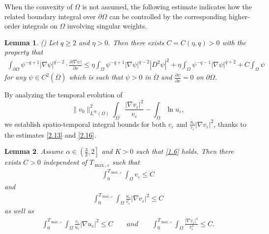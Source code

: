 \documentclass[12pt]{article}
\theoremstyle{plain}
\newtheorem{lemma}{Lemma}[section]
\theoremstyle{definition}
\numberwithin{equation}{section}
\begin{document}
When the  convexity of $\Omega$ is not assumed, the following estimate indicates  how the related boundary integral over $\partial \Omega$ can be controlled by the corresponding higher-order integrals on $\Omega$ involving singular weights.
\begin{lemma}\label{lemma2.4}(\cite{WDCDSB})
    Let $q\geq2$ and $\eta>0$. Then there exists $C=C(\eta,q)>0$ with the property that
    \begin{align}\label{2.16}
        \int_{\partial\Omega}\psi^{-q+1}|\nabla\psi|^{q-2}\cdot\frac{\partial|\nabla \psi|}{\partial\nu}\leq \eta
        \int_{\Omega}\psi^{-q+1}|\nabla\psi|^{q-2}|D^2\psi|^2+\eta\int_{\Omega}\psi^{-q-1}|\nabla\psi|^{q+2}+C\int_{\Omega}\psi
    \end{align}
    for any $\psi\in C^2(\overline{\Omega})$ which is such that $\psi>0$ in $\overline{\Omega}$ and $\frac{\partial\psi}{\partial\nu}=0$ on
    $\partial\Omega$.
\end{lemma}
By analyzing the temporal evolution of
 $$\|v_0\|_{L^{\infty}(\Omega)}^2\int_{\Omega} \frac{|\nabla v_{\varepsilon}|^2}{v_{\varepsilon}}-\int_{\Omega}\ln{u_{\varepsilon}},$$
 we establish spatio-temporal integral bounds for both $v_{\varepsilon}$ and
$\frac{u_{\varepsilon}}{v_{\varepsilon}}|\nabla  v_{\varepsilon }|^2$,  thanks to  the
   estimates \eqref{2.13} and \eqref{2.16}.
\begin{lemma}\label{lemma2.5}
Assume $\alpha\in\left(\frac{3}{2},2\right]$ and $K>0$ such
that \eqref{1.6} holds. Then  there exists $C>0$ independent of $T_{\max, \varepsilon}$  such that
\begin{align}\label{2.18}
\int_0^{T_{\max, \varepsilon}}\int_{\Omega}v_{\varepsilon}\leq C
\end{align}
and
\begin{align}\label{2.19}
\int_0^{T_{\max, \varepsilon}}\int_{\Omega} \frac{u_{\varepsilon}}{v_{\varepsilon}}|\nabla  v_{\varepsilon }|^2 \leq C
\end{align}
as well as
\begin{align}\label{2.19-1}
\int_0^{T_{\max, \varepsilon}}\int_{\Omega} \frac{v_{\varepsilon}}{u_{\varepsilon}}|\nabla  u_{\varepsilon }|^2 \leq C\qquad and \qquad\int_0^{T_{\max, \varepsilon}}\int_{\Omega} \frac{|\nabla  v_{\varepsilon }|^4}{v_{\varepsilon}^3} \leq C.
\end{align}
\end{lemma}
\end{document}
